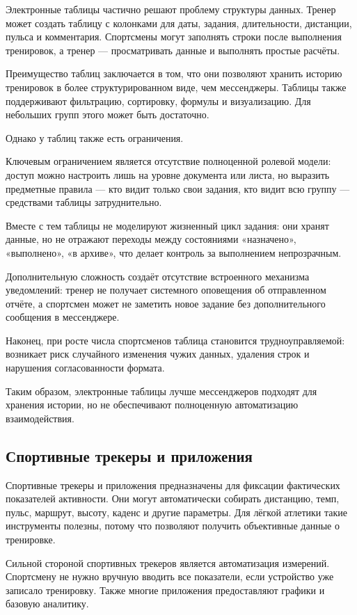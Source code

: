 Электронные таблицы частично решают проблему структуры данных. Тренер может создать таблицу с колонками для даты, задания, длительности, дистанции, пульса и комментария. Спортсмены могут заполнять строки после выполнения тренировок, а тренер --- просматривать данные и выполнять простые расчёты.

Преимущество таблиц заключается в том, что они позволяют хранить историю тренировок в более структурированном виде, чем мессенджеры. Таблицы также поддерживают фильтрацию, сортировку, формулы и визуализацию. Для небольших групп этого может быть достаточно.

Однако у таблиц также есть ограничения.

Ключевым ограничением является отсутствие полноценной ролевой модели: доступ можно настроить лишь на уровне документа или листа, но выразить предметные правила --- кто видит только свои задания, кто видит всю группу --- средствами таблицы затруднительно.

Вместе с тем таблицы не моделируют жизненный цикл задания: они хранят данные, но не отражают переходы между состояниями «назначено», «выполнено», «в архиве», что делает контроль за выполнением непрозрачным.

Дополнительную сложность создаёт отсутствие встроенного механизма уведомлений: тренер не получает системного оповещения об отправленном отчёте, а спортсмен может не заметить новое задание без дополнительного сообщения в мессенджере.

Наконец, при росте числа спортсменов таблица становится трудноуправляемой: возникает риск случайного изменения чужих данных, удаления строк и нарушения согласованности формата.

Таким образом, электронные таблицы лучше мессенджеров подходят для хранения истории, но не обеспечивают полноценную автоматизацию взаимодействия.

\subsection{Спортивные трекеры и приложения}

Спортивные трекеры и приложения предназначены для фиксации фактических показателей активности. Они могут автоматически собирать дистанцию, темп, пульс, маршрут, высоту, каденс и другие параметры. Для лёгкой атлетики такие инструменты полезны, потому что позволяют получить объективные данные о тренировке.

Сильной стороной спортивных трекеров является автоматизация измерений. Спортсмену не нужно вручную вводить все показатели, если устройство уже записало тренировку. Также многие приложения предоставляют графики и базовую аналитику.


